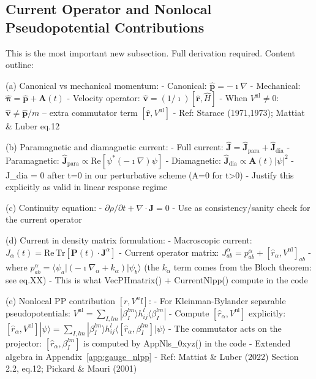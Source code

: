 

\subsection{Current Operator and Nonlocal Pseudopotential Contributions}
\label{sec:current}

This is the most important new subsection. Full derivation required.
Content outline:

(a) Canonical vs mechanical momentum:
    - Canonical: $\hat{\mathbf{p}} = -\imath\nabla$
    - Mechanical: $\hat{\boldsymbol{\pi}} = \hat{\mathbf{p}} + \mathbf{A}(t)$
    - Velocity operator: $\hat{\mathbf{v}} = (1/\imath)[\hat{\mathbf{r}}, \hat{H}]$
    - When $V^{\mathrm{nl}} \neq 0$: $\hat{\mathbf{v}} \neq \hat{\mathbf{p}}/m$
      -- extra commutator term $[\hat{\mathbf{r}}, V^{\mathrm{nl}}]$
    - Ref: Starace (1971,1973); Mattiat \& Luber eq.12

(b) Paramagnetic and diamagnetic current:
    - Full current: $\hat{\mathbf{J}} = \hat{\mathbf{J}}_{\mathrm{para}} + \hat{\mathbf{J}}_{\mathrm{dia}}$
    - Paramagnetic: $\hat{\mathbf{J}}_{\mathrm{para}} \propto \mathrm{Re}[\psi^*(-\imath\nabla)\psi]$
    - Diamagnetic: $\hat{\mathbf{J}}_{\mathrm{dia}} \propto \mathbf{A}(t)|\psi|^2$
    - J\_dia = 0 after t=0 in our perturbative scheme (A=0 for t>0)
    - Justify this explicitly as valid in linear response regime

(c) Continuity equation:
    - $\partial\rho/\partial t + \nabla\cdot\mathbf{J} = 0$
    - Use as consistency/sanity check for the current operator

(d) Current in density matrix formulation:
    - Macroscopic current: $J_\alpha(t) = \mathrm{Re}\,\mathrm{Tr}[\mathbf{P}(t)\cdot\mathbf{J}^\alpha]$
    - Current operator matrix: $J^\alpha_{ab} = p^\alpha_{ab} + [\hat{r}_\alpha, V^{\mathrm{nl}}]_{ab}$
    - where $p^\alpha_{ab} = \langle\psi_a|(-\imath\nabla_\alpha + k_\alpha)|\psi_b\rangle$
      (the $k_\alpha$ term comes from the Bloch theorem: see eq.XX)
    - This is what VecPHmatrix() + CurrentNlpp() compute in the code

(e) Nonlocal PP contribution $[r, V^nl]$:
    - For Kleinman-Bylander separable pseudopotentials:
      $V^{\mathrm{nl}} = \sum_{I,lm} |\beta^{lm}_I\rangle h^l_{ij} \langle\beta^{lm}_I|$
    - Compute $[\hat{r}_\alpha, V^{\mathrm{nl}}]$ explicitly:
      $[\hat{r}_\alpha, V^{\mathrm{nl}}]|\psi\rangle =
       \sum_{I,lm} |\beta^{lm}_I\rangle h^l_{ij}
       \langle[\hat{r}_\alpha, \beta^{lm}_I]|\psi\rangle$
    - The commutator acts on the projector: $[\hat{r}_\alpha, \beta^{lm}_I]$
      is computed by AppNls\_0xyz() in the code
    - Extended algebra in Appendix~\ref{app:gauge_nlpp}
    - Ref: Mattiat \& Luber (2022) Section 2.2, eq.12;
           Pickard \& Mauri (2001)

